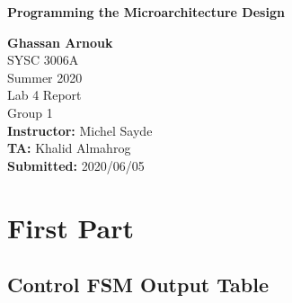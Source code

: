 \documentclass{article}
\begin{document}
	\begin{titlepage}
		\begin{center}
			\vspace{1cm}
			{\LARGE\textbf{Programming the Microarchitecture Design}}

			\vspace{1.5cm}
			\textbf{\large Ghassan Arnouk}\\
			
			\vspace{1cm}
			\large SYSC 3006A\\
			\large Summer 2020\\
			\large Lab 4 Report\\
			\large Group 1\\
			
						
			\vspace{2cm}
			\textbf{Instructor:} Michel Sayde\\
			
			\vspace{0.1cm}
			\textbf{TA:} Khalid Almahrog\\
			
			\vspace{0.1cm}
			\textbf{Submitted:} 2020/06/05\\			
		\end{center}
	\end{titlepage}
	
	\pagebreak
	
	\section{First Part}
	\subsection{Control FSM Output Table}
\end{document}
